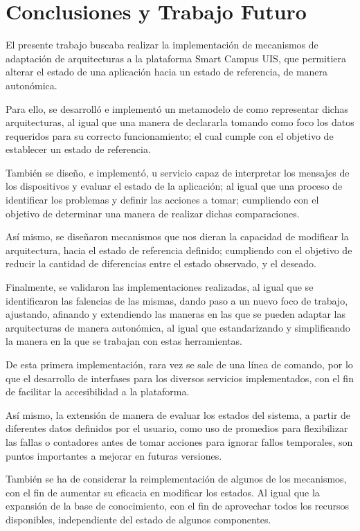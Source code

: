 \newpage
\section{Conclusiones y Trabajo Futuro} \label{sec:future}

El presente trabajo buscaba realizar la implementación de mecanismos de adaptación de arquitecturas a la plataforma Smart Campus UIS, que permitiera alterar el estado de una aplicación hacia un estado de referencia, de manera autonómica.

Para ello, se desarrolló e implementó un metamodelo de como representar dichas arquitecturas, al igual que una manera de declararla tomando como foco los datos requeridos para su correcto funcionamiento; el cual cumple con el objetivo de establecer un estado de referencia.

También se diseño, e implementó, u servicio capaz de interpretar los mensajes de los dispositivos y evaluar el estado de la aplicación; al igual que una proceso de identificar los problemas y definir las acciones a tomar; cumpliendo con el objetivo de determinar una manera de realizar dichas comparaciones.

Así mismo, se diseñaron mecanismos que nos dieran la capacidad de modificar la arquitectura, hacia el estado de referencia definido; cumpliendo con el objetivo de reducir la cantidad de diferencias entre el estado observado, y el deseado.

Finalmente, se validaron las implementaciones realizadas, al igual que se identificaron las falencias de las mismas, dando paso a un nuevo foco de trabajo, ajustando, afinando y extendiendo las maneras en las que se pueden adaptar las arquitecturas de manera autonómica, al igual que estandarizando y simplificando la manera en la que se trabajan con estas herramientas.

De esta primera implementación, rara vez se sale de una línea de comando, por lo que el desarrollo de interfases para los diversos servicios implementados, con el fin de facilitar la accesibilidad a la plataforma.

Así mismo, la extensión de manera de evaluar los estados del sistema, a partir de diferentes datos definidos por el usuario, como uso de promedios para flexibilizar las fallas o contadores antes de tomar acciones para ignorar fallos temporales, son puntos importantes a mejorar en futuras versiones.

También se ha de considerar la reimplementación de algunos de los mecanismos, con el fin de aumentar su eficacia en modificar los estados. Al igual que la expansión de la base de conocimiento, con el fin de aprovechar todos los recursos disponibles, independiente del estado de algunos componentes.

